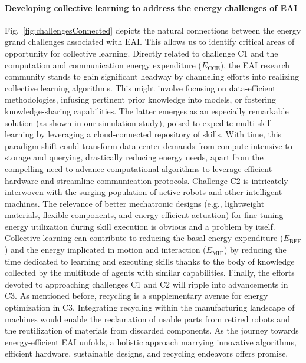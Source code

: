 \documentclass[12pt]{article}
\begin{document}
\paragraph*{Developing collective learning to address the energy challenges of EAI}
Fig.~\ref{fig:challengesConnected} depicts the natural connections between the energy grand challenges associated with EAI. This allows us to identify critical areas of opportunity for collective learning. Directly related to challenge C1 and the computation and communication energy expenditure ($E_\text{CCE}$), the EAI research community stands to gain significant headway by channeling efforts into realizing collective learning algorithms. This might involve focusing on data-efficient methodologies, infusing pertinent prior knowledge into models, or fostering knowledge-sharing capabilities. The latter emerges as an especially remarkable solution (as shown in our simulation study), poised to expedite multi-skill learning by leveraging a cloud-connected repository of skills. With time, this paradigm shift could transform data center demands from compute-intensive to storage and querying, drastically reducing energy needs, apart from the compelling need to advance computational algorithms to leverage efficient hardware and streamline communication protocols. Challenge C2 is intricately interwoven with the surging population of active robots and other intelligent machines. The relevance of better mechatronic designs (e.g., lightweight materials, flexible components, and energy-efficient actuation) for fine-tuning energy utilization during skill execution is obvious and a problem by itself. Collective learning can contribute to reducing the basal energy expenditure ($E_\text{BEE}$) and the energy implicated in motion and interaction ($E_\text{MIE}$) by reducing the time dedicated to learning and executing skills thanks to the body of knowledge collected by the multitude of agents with similar capabilities. Finally, the efforts devoted to approaching challenges C1 and C2 will ripple into advancements in C3. As mentioned before, recycling is a supplementary avenue for energy optimization in C3. Integrating recycling within the manufacturing landscape of machines would enable the reclamation of usable parts from retired robots and the reutilization of materials from discarded components. As the journey towards energy-efficient EAI unfolds, a holistic approach marrying innovative algorithms, efficient hardware, sustainable designs, and recycling endeavors offers promise.
\end{document}

